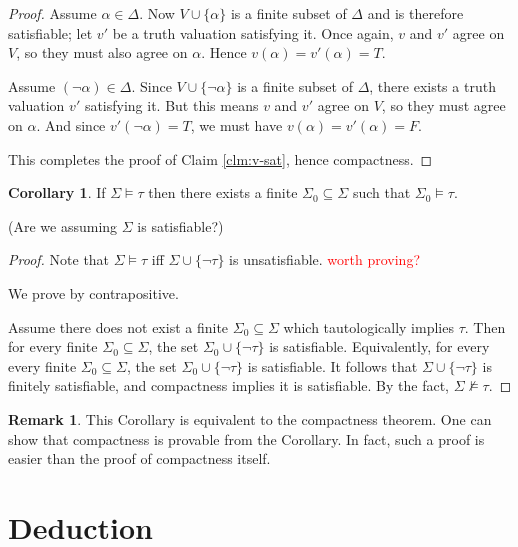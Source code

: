 \documentclass[12pt]{article}
\theoremstyle{definition}
\newtheorem{corollary}[theorem]{Corollary}
\newtheorem{remark}[theorem]{Remark}
\newcommand{\<}{\langle}
\renewcommand{\>}{\rangle}
\newcommand{\seq}{\subseteq}
\begin{document}
\begin{proof}

    Assume $\alpha \in \Delta$.
    Now $V \cup \{\alpha\}$ is a finite subset of $\Delta$ and is therefore satisfiable; let $v'$ be a truth valuation satisfying it.
    Once again, $v$ and $v'$ agree on $V$, so they must also agree on $\alpha$.
    Hence $v(\alpha) = v'(\alpha) = T$.

    Assume $(\lnot\alpha) \in \Delta$.
    Since $V \cup \{\lnot\alpha\}$ is a finite subset of $\Delta$, there exists a truth valuation $v'$ satisfying it.
    But this means $v$ and $v'$ agree on $V$, so they must agree on $\alpha$.
    And since $v'(\lnot\alpha) = T$, we must have $v(\alpha) = v'(\alpha) = F$.

    This completes the proof of Claim \ref{clm:v-sat}, hence compactness.
\end{proof}


\begin{corollary}
    If $\Sigma \vDash \tau$ then there exists a finite $\Sigma_0 \seq \Sigma$ such that $\Sigma_0 \vDash \tau$.
\end{corollary}

(Are we assuming $\Sigma$ is satisfiable?)

\begin{proof}
    Note that $\Sigma \vDash \tau$ iff $\Sigma \cup \{\lnot\tau\}$ is unsatisfiable.
    \textcolor{red}{worth proving?}

    We prove by contrapositive.

    Assume there does not exist a finite $\Sigma_0 \seq \Sigma$ which tautologically implies $\tau$.
    Then for every finite $\Sigma_0 \seq \Sigma$, the set $\Sigma_0 \cup \{\lnot\tau\}$ is satisfiable.
    Equivalently, for every every finite $\Sigma_0 \seq \Sigma$, the set $\Sigma_0 \cup \{\lnot\tau\}$ is satisfiable.
    It follows that $\Sigma \cup \{\lnot\tau\}$ is finitely satisfiable, and compactness implies it is satisfiable.
    By the fact, $\Sigma \nvDash \tau$.
\end{proof}

\begin{remark}
    This Corollary is equivalent to the compactness theorem.
    One can show that compactness is provable from the Corollary.
    In fact, such a proof is easier than the proof of compactness itself.
\end{remark}

\section{Deduction}
\end{document}
